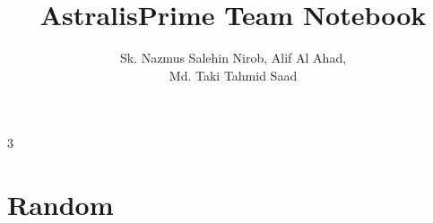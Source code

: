 \documentclass[8pt, a4paper, onesided]{article}
\title{\vspace{-2.5ex}AstralisPrime Team Notebook}
\author{Sk. Nazmus Salehin Nirob, Alif Al Ahad,\\Md. Taki Tahmid Saad}
\date{}
\begin{document}
\begin{landscape}
\begin{multicols*}{3}

\maketitle
\vspace{-7ex}
\tableofcontents
\pagestyle{fancy}
 
\raggedbottom


\section{Random}
    
\end{multicols*}


\end{landscape}
\end{document}
